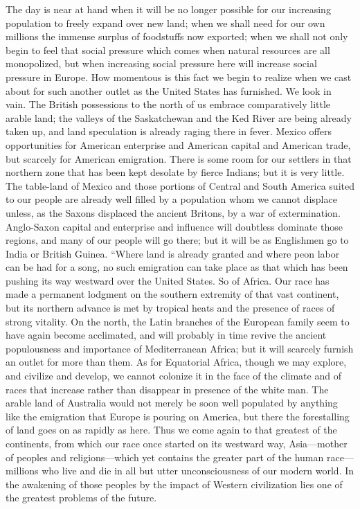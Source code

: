 \documentclass{book}
\begin{document}
The day is near at hand when it will be no longer possible for our increasing population to freely expand over new land; when we shall need for our own millions the immense surplus of foodstuffs now exported; when we shall not only begin to feel that social pressure which comes when natural resources are all monopolized, but when increasing social pressure here will increase social pressure in Europe. How momentous is this fact we begin to realize when we cast about for such another outlet as the United States has furnished. We look in vain. The British possessions to the north of us embrace comparatively little arable land; the valleys of the Saskatchewan and the Ked River are being already taken up, and land speculation is already raging there in fever. Mexico offers opportunities for American enterprise and American capital and American trade, but scarcely for American emigration. There is some room for our settlers in that northern zone that has been kept desolate by fierce Indians; but it is very little. The table-land of Mexico and those portions of Central and South America suited to our people are already well filled by a population whom we cannot displace unless, as the Saxons displaced the ancient Britons, by a war of extermination. Anglo-Saxon capital and enterprise and influence will doubtless dominate those regions, and many of our people will go there; but it will be as Englishmen go to India or British Guinea. “Where land is already granted and where peon labor can be had for a song, no such emigration can take place as that which has been pushing its way westward over the United States. So of Africa. Our race has made a permanent lodgment on the southern extremity of that vast continent, but its northern advance is met by tropical heats and the presence of races of strong vitality. On the north, the Latin branches of the European family seem to have again become acclimated, and will probably in time revive the ancient populousness and importance of Mediterranean Africa; but it will scarcely furnish an outlet for more than them. As for Equatorial Africa, though we may explore, and civilize and develop, we cannot colonize it in the face of the climate and of races that increase rather than disappear in presence of the white man. The arable land of Australia would not merely be soon well populated by anything like the emigration that Europe is pouring on America, but there the forestalling of land goes on as rapidly as here. Thus we come again to that greatest of the continents, from which our race once started on its westward way, Asia—mother of peoples and religions—which yet contains the greater part of the human race—millions who live and die in all but utter unconsciousness of our modern world. In the awakening of those peoples by the impact of Western civilization lies one of the greatest problems of the future.
\end{document}

